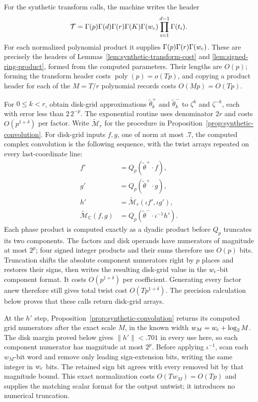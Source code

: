For the synthetic transform calls, the machine writes the header
\[
 \mathcal T=\Gamma(p)\Gamma(d)\Gamma(r)\Gamma(K)\Gamma(w_{\rm c})
       \prod_{i=1}^{d-1}\Gamma(t_i).
\]
For each normalized polynomial product it supplies
$\Gamma(p)\Gamma(r)\Gamma(w_{\rm c})$. These are precisely the headers
of Lemmas~\ref{lem:synthetic-transform-cost} and
\ref{lem:signed-ring-product}, formed from the computed parameters.
Their lengths are $O(p)$; forming the transform header costs
$\operatorname{poly}(p)=o(Tp)$, and copying a product header for each of
the $M=T/r$ polynomial records costs $O(Mp)=O(Tp)$.

For $0\le k<r$, obtain disk-grid approximations
$\widetilde\theta_k^+$ and $\widetilde\theta_k^-$ to $\zeta^k$ and
$\zeta^{-k}$, each with error less than $2\,2^{-p}$.  The exponential
routine uses denominator $2r$ and costs $O(p^{1+\delta})$ per factor.
Write $\widetilde{\mathcal M}_r$ for the procedure in
Proposition~\ref{prop:synthetic-convolution}.  For disk-grid inputs
$f,g$, one of norm at most $.7$, the computed complex convolution is the
following sequence,
with the twist arrays repeated on every last-coordinate line:
\[
 \begin{aligned}
 f'&=Q_p(\widetilde\theta^+\mathbin{\cdot}f),\\
 g'&=Q_p(\widetilde\theta^+\mathbin{\cdot}g),\\
 h'&=\widetilde{\mathcal M}_r(\iota f',\iota g'),\\
 \widetilde{\mathcal M}_{\mathbb C}(f,g)
   &=Q_p\!\left(\widetilde\theta^-\mathbin{\cdot}
                    \iota^{-1}h'\right).
 \end{aligned}
\]
Each phase product is computed exactly as a dyadic product before
$Q_p$ truncates its two components. The factors and disk operands have
numerators of magnitude at most $2^p$; four signed integer products and
their sums therefore use $O(p)$ bits. Truncation shifts the absolute
component numerators right by $p$ places and restores their signs, then
writes the resulting disk-grid value in the $w_{\rm c}$-bit component
format. It costs $O(p^{1+\delta})$ per coefficient. Generating every
factor anew therefore still gives total
twist cost $O(Tp^{1+\delta})$. The precision calculation below proves
that these calls return disk-grid arrays.

At the $h'$ step, Proposition~\ref{prop:synthetic-convolution} returns
its computed grid numerators after the exact scale $M$, in the known width
$w_M=w_{\rm c}+\log_2M$. The disk margin proved below gives
$\|h'\|<.701$ in every use here, so each component numerator has
magnitude at most $2^p$. Before applying $\iota^{-1}$, scan each
$w_M$-bit word and remove only leading sign-extension bits, writing the
same integer in $w_{\rm c}$ bits. The retained sign bit agrees with every
removed bit by that magnitude bound. This exact normalization costs
$O(Tw_M)=O(Tp)$ and supplies the matching scalar format for the output
untwist; it introduces no numerical truncation.

